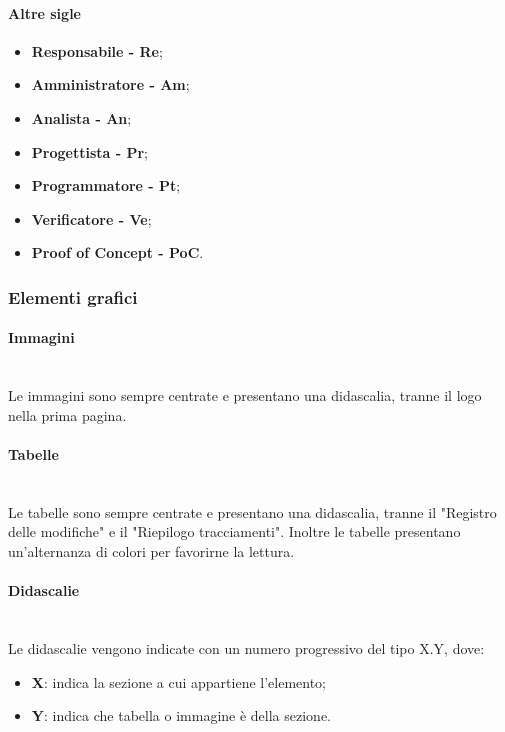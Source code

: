                 \paragraph{Altre sigle}
                    \begin{itemize}
                        \item \textbf{Responsabile - Re};
                        \item \textbf{Amministratore - Am};
                        \item \textbf{Analista - An};
                        \item \textbf{Progettista - Pr};
                        \item \textbf{Programmatore - Pt};
                        \item \textbf{Verificatore - Ve};
                        \item \textbf{Proof of Concept - PoC}.
                    \end{itemize}
            \subsubsection{Elementi grafici}
                    \paragraph{Immagini}\mbox{}\\ [1mm]
                        Le immagini sono sempre centrate e presentano una didascalia, tranne il logo nella prima pagina.
                    \paragraph{Tabelle}\mbox{}\\ [1mm]
                        Le tabelle sono sempre centrate e presentano una didascalia, tranne il "Registro delle modifiche" e il "Riepilogo tracciamenti".
                        Inoltre le tabelle presentano un'alternanza di colori per favorirne la lettura.
                    \paragraph{Didascalie}\mbox{}\\ [1mm]
                        Le didascalie vengono indicate con un numero progressivo del tipo X.Y, dove:
                        \begin{itemize}
                            \item \textbf{X}: indica la sezione a cui appartiene l'elemento;
                            \item \textbf{Y}: indica che tabella o immagine è della sezione.
                        \end{itemize}
